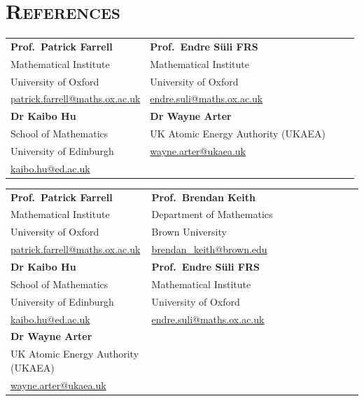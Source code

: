 
\section{\textsc{References}}

\hspace{26.5mm}
\begin{tabular}{p{0.4\linewidth} p{0.6\linewidth}}
    \textbf{Prof.~Patrick Farrell}  &  \textbf{Prof.~Endre Süli FRS}  \\
    Mathematical Institute  &  Mathematical Institute  \\
    University of Oxford  &  University of Oxford  \\
    \href{mailto:patrick.farrell@maths.ox.ac.uk}{patrick.farrell@maths.ox.ac.uk}  &  \href{mailto:endre.suli@maths.ox.ac.uk}{endre.suli@maths.ox.ac.uk}  \\
    \vspace{1mm}\textbf{Dr Kaibo Hu}  &  \vspace{1mm}\textbf{Dr Wayne Arter}  \\
    School of Mathematics  &  UK Atomic Energy Authority (UKAEA)  \\
    University of Edinburgh  &  \href{mailto:wayne.arter@ukaea.uk}{wayne.arter@ukaea.uk}  \\
    \href{mailto:kaibo.hu@ed.ac.uk}{kaibo.hu@ed.ac.uk}  &  
\end{tabular}

\hspace{26.5mm}
\begin{tabular}{p{0.4\linewidth} p{0.6\linewidth}}
    \textbf{Prof.~Patrick Farrell}  &  \textbf{Prof.~Brendan Keith}  \\
    Mathematical Institute  &  Department of Mathematics  \\
    University of Oxford  &  Brown University  \\
    \href{mailto:patrick.farrell@maths.ox.ac.uk}{patrick.farrell@maths.ox.ac.uk}  &  \href{mailto:brendan_keith@brown.edu}{brendan\_keith@brown.edu}  \\
    \vspace{1mm}\textbf{Dr Kaibo Hu}  &  \vspace{1mm}\textbf{Prof.~Endre Süli FRS}  \\
    School of Mathematics  &  Mathematical Institute  \\
    University of Edinburgh  &  University of Oxford  \\
    \href{mailto:kaibo.hu@ed.ac.uk}{kaibo.hu@ed.ac.uk}  &  \href{mailto:endre.suli@maths.ox.ac.uk}{endre.suli@maths.ox.ac.uk}  \\
    \vspace{1mm}\textbf{Dr Wayne Arter}  &  \\
    UK Atomic Energy Authority (UKAEA)  &  \\
    \href{mailto:wayne.arter@ukaea.uk}{wayne.arter@ukaea.uk}  &  
\end{tabular}